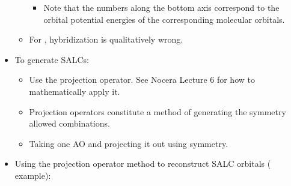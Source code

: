 \documentclass[../notes.tex]{subfiles}
\begin{document}
\begin{itemize}
\begin{itemize}
\begin{itemize}
            \item Note that the numbers along the bottom axis correspond to the orbital potential energies of the corresponding molecular orbitals.
        \end{itemize}
        \item For , hybridization is qualitatively wrong.
    \end{itemize}
    \item To generate SALCs:
    \begin{itemize}
        \item Use the projection operator. See Nocera Lecture 6 for how to mathematically apply it.
        \item Projection operators constitute a method of generating the symmetry allowed combinations.
        \item Taking one AO and projecting it out using symmetry.
    \end{itemize}
    \item Using the projection operator method to reconstruct SALC orbitals ( example):
    \begin{figure}[H]
        \centering
\end{figure}
\end{itemize}
\end{document}
